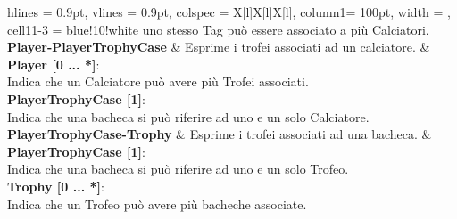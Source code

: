 \begin{tblr}{
    hlines = {0.9pt}, vlines = {0.9pt}, colspec = {X[l]X[l]X[l]}, column{1}= {100pt},
    width = \textwidth, cell{1}{1-3} = {blue!10!white}
}
{			uno stesso Tag può essere associato a
			più Calciatori.
	}
	\\
	{
		\textbf{Player-PlayerTrophyCase}
	}
	&
	{
		Esprime i trofei associati ad un calciatore.
	}	
	&
	{
		\textbf{Player [0 ... *]}:\\Indica che un Calciatore
			può avere più Trofei associati.\\
		\medskip\textbf{PlayerTrophyCase [1]}:\\Indica che una
			bacheca si può riferire ad uno e un solo Calciatore.
	}
	\\
	{
		\textbf{PlayerTrophyCase-Trophy}
	}
	&
	{
		Esprime i trofei associati ad una bacheca.
	}
	&
	{
		\textbf{PlayerTrophyCase [1]}:\\Indica che una bacheca
			si può riferire ad uno e un solo Trofeo.\\
		\medskip\textbf{Trophy [0 ... *]}:\\Indica che
			un Trofeo può avere più bacheche associate.
	}
	\\
\end{tblr}

\newpage

